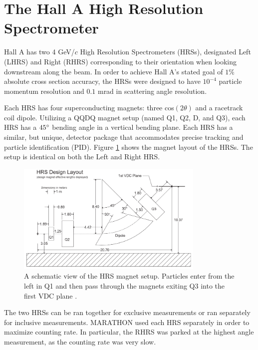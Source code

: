\section{The Hall A High Resolution Spectrometer}

Hall A has two 4 GeV/$c$ High Resolution Spectrometers (HRSs), designated Left (LHRS) and Right (RHRS) corresponding to their orientation when looking downstream along the beam. In order to achieve Hall A's stated goal of $1\%$ absolute cross section accuracy, the HRSs were designed to have $10^{-4}$ particle momentum resolution and $0.1$ mrad in scattering angle resolution. 

Each HRS has four superconducting magnets: three cos$\left(2\theta\right)$ and a racetrack coil dipole. Utilizing a QQDQ magnet setup (named Q1, Q2, D, and Q3), each HRS has a $45\degree$ bending angle in a vertical bending plane. Each HRS has a similar, but unique, detector package that accommodates precise tracking and particle identification (PID). Figure \ref{fig:hrs_mags} shows the magnet layout of the HRSs. The setup is identical on both the Left and Right HRS.

\begin{figure}
\begin{center}
	\includegraphics[width=0.8\textwidth]{./setup/fig/HRS_mags.png}
	\caption{A schematic view of the HRS magnet setup. Particles enter from the left in Q1 and then pass through the magnets exiting Q3 into the first VDC plane \cite{HANIM}.}
	\label{fig:hrs_mags}
\end{center}
\end{figure}

The two HRSs can be ran together for exclusive measurements or ran separately for inclusive measurements. MARATHON used each HRS separately in order to maximize counting rate. In particular, the RHRS was parked at the highest angle measurement, as the counting rate was very slow.

